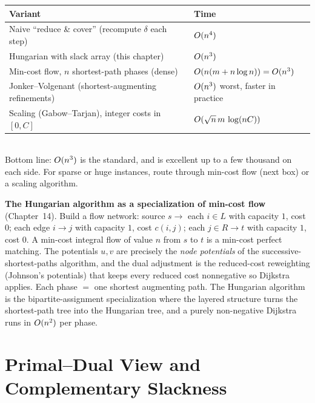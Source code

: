 \begin{complexitybox}
\begin{tabular}{ll}
\toprule
Variant & Time \\
\midrule
Naive ``reduce \& cover'' (recompute $\delta$ each step)      & $O(n^4)$ \\
Hungarian with slack array (this chapter)                     & $O(n^3)$ \\
Min-cost flow, $n$ shortest-path phases (dense)               & $O(n(m+n\log n)) = O(n^3)$ \\
Jonker--Volgenant (shortest-augmenting refinements)           & $O(n^3)$ worst, faster in practice \\
Scaling (Gabow--Tarjan), integer costs in $[0,C]$             & $O(\sqrt{n}\,m\,\log(nC))$ \\
\bottomrule
\end{tabular}
\\[0.4em]
Bottom line: $O(n^3)$ is the standard, and is excellent up to a few thousand on each side. For sparse or huge instances, route through min-cost flow (next box) or a scaling algorithm.
\end{complexitybox}

\begin{connectionbox}
\textbf{The Hungarian algorithm as a specialization of min-cost flow} (Chapter~14). Build a flow network: source $s\to$ each $i\in L$ with capacity $1$, cost $0$; each edge $i\to j$ with capacity $1$, cost $c(i,j)$; each $j\in R\to t$ with capacity $1$, cost $0$. A min-cost integral flow of value $n$ from $s$ to $t$ is a min-cost perfect matching. The potentials $u,v$ are precisely the \emph{node potentials} of the successive-shortest-paths algorithm, and the dual adjustment is the reduced-cost reweighting (Johnson's potentials) that keeps every reduced cost nonnegative so Dijkstra applies. Each phase $=$ one shortest augmenting path. The Hungarian algorithm is the bipartite-assignment specialization where the layered structure turns the shortest-path tree into the Hungarian tree, and a purely non-negative Dijkstra runs in $O(n^2)$ per phase.
\end{connectionbox}

\section{Primal--Dual View and Complementary Slackness}
\label{ch16:lp}

